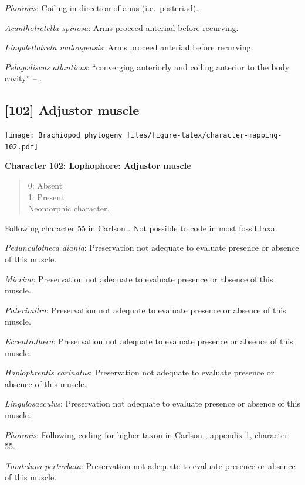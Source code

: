 \documentclass[openany]{book}
\theoremstyle{definition}
\theoremstyle{definition}
\theoremstyle{definition}
\theoremstyle{remark}
\begin{document}
\emph{Phoronis}: Coiling in direction of anus (i.e.~posteriad).

\emph{Acanthotretella spinosa}: Arms proceed anteriad before recurving.

\emph{Lingulellotreta malongensis}: Arms proceed anteriad before
recurving.

\emph{Pelagodiscus atlanticus}: ``converging anteriorly and coiling
anterior to the body cavity'' -- \citet{Zhang2009Architectureand}.

\hypertarget{adjustor-muscle}{%
\subsection*{{[}102{]} Adjustor muscle}\label{adjustor-muscle}}

\texttt{[image: Brachiopod\_phylogeny\_files/figure-latex/character-mapping-102.pdf]}

\textbf{Character 102: Lophophore: Adjustor muscle}

\begin{quote}
0: Absent\\
1: Present\\
Neomorphic character.
\end{quote}

Following character 55 in Carlson
\citeyearpar{Carlson1995Phylogeneticrelationships}. Not possible to code
in most fossil taxa.

\emph{Pedunculotheca diania}: Preservation not adequate to evaluate
presence or absence of this muscle.

\emph{Micrina}: Preservation not adequate to evaluate presence or
absence of this muscle.

\emph{Paterimitra}: Preservation not adequate to evaluate presence or
absence of this muscle.

\emph{Eccentrotheca}: Preservation not adequate to evaluate presence or
absence of this muscle.

\emph{Haplophrentis carinatus}: Preservation not adequate to evaluate
presence or absence of this muscle.

\emph{Lingulosacculus}: Preservation not adequate to evaluate presence
or absence of this muscle.

\emph{Phoronis}: Following coding for higher taxon in Carlson
\citeyearpar{Carlson1995Phylogeneticrelationships}, appendix 1,
character 55.

\emph{Tomteluva perturbata}: Preservation not adequate to evaluate
presence or absence of this muscle.
\end{document}
